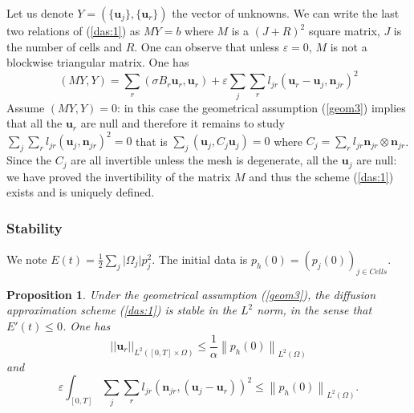 \documentclass[a4paper,french,english,10pt]{article}
\newcommand\ljr{l_{jr}}
\newcommand\njr{\mathbf{n}_{jr}}
\newcommand\uu{\mathbf{u}}
\newcommand\eps{\varepsilon}
\newcommand\uj{\uu_j}
\newcommand\ur{\uu_r}
\newtheorem{pro}[theorem]{Proposition}
\begin{document}
Let us denote $Y=(\{\uu_j\}, \{\uu_r\})$  the vector of unknowns. We can write
 the last
two relations of (\ref{das:1}) as
$MY=b$ where $M$ is a $(J+R)^2$ square matrix, $J$ is the number of cells  and $R$.
One can observe that unless $\eps=0$, $M$ is not a blockwise
triangular matrix.
One has
$$(MY,Y)=\sum_r \left (\sigma B_r \uu_r, \uu_r\right ) 
+\eps\sum_j\sum_r \ljr \left( \uu_r- \uu_j,  \njr\right )^2$$
Assume  $(MY,Y)=0$: in this case   the geometrical assumption  (\ref{geom3}) implies that all
the $\uu_r$ are null and therefore it remains to study 
$
\sum_j\sum_r \ljr \left(  \uu_j,  \njr\right )^2=0
$ that is
$ \sum_j\left (\uu_j, C_j\uu_j\right )=0$ where $
C_j=\sum_r l_{jr} \mathbf n_{jr} \otimes \mathbf n_{jr}$.
 Since  the $C_j$ are all invertible
unless the mesh is degenerate, all the $\uu_j$ are null: we have proved the
invertibility of the matrix $M$ and thus the scheme (\ref{das:1}) exists and is
uniquely defined.



\subsubsection{Stability}
We note $
E(t)=
\displaystyle \frac12  \sum_j \vert \Omega_j\vert p_j^2$.
The initial data is    $p_h(0)=\left( p_j(0)\right)_{j\in Cells}$.

\begin{pro}\label{das_stab} Under the geometrical assumption (\ref{geom3}), the
diffusion approximation scheme (\ref{das:1})  is stable in the $L^2$
norm, in the sense that $E'(t)\leq 0$.  One has 
\begin{equation}\label{das:gggg}
\vert\vert \uu_r \vert\vert_{L^2([0,T]\times \Omega)}\leq
\frac{1}{\alpha}  \left\|  p_h(0) \right\|_{L^2(\Omega)}
\end{equation}
and
\begin{equation}\label{das:gs}
\eps \int_{[0,T]}\sum_j \sum_r
l_{jr}(\njr,(\uj-\ur))^{2} \leq  
 \left\|   p_h(0) \right\|_{L^2(\Omega)}.
\end{equation}
\end{pro}
\end{document}
